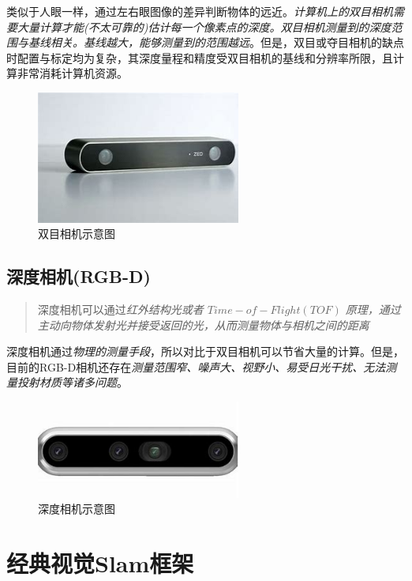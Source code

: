 类似于人眼一样，通过左右眼图像的差异判断物体的远近。\emph{计算机上的双目相机需要大量计算才能(不太可靠的)估计每一个像素点的深度。双目相机测量到的深度范围与基线相关。基线越大，能够测量到的范围越远}。但是，双目或夺目相机的缺点时配置与标定均为复杂，其深度量程和精度受双目相机的基线和分辨率所限，且计算非常消耗计算机资源。

\begin{figure}[!htbp]
    \centering
    \includegraphics[width=0.6\textwidth]{image/chapter01/双目相机.jpg}
    \caption{双目相机示意图}
\end{figure}

\subsection{深度相机(RGB-D)}

\begin{quote}
    \centering
    深度相机可以通过\emph{红外结构光或者 $Time-of-Flight(TOF)$ 原理，通过主动向物体发射光并接受返回的光，从而测量物体与相机之间的距离}
\end{quote}

    深度相机通过\emph{物理的测量手段}，所以对比于双目相机可以节省大量的计算。但是，目前的RGB-D相机还存在\emph{测量范围窄、噪声大、视野小、易受日光干扰、无法测量投射材质等诸多问题}。

\begin{figure}[!htbp]
    \centering
    \includegraphics[width=0.6\textwidth]{image/chapter01/深度相机.jpg}
    \caption{深度相机示意图}
\end{figure}

\section{经典视觉Slam框架}

